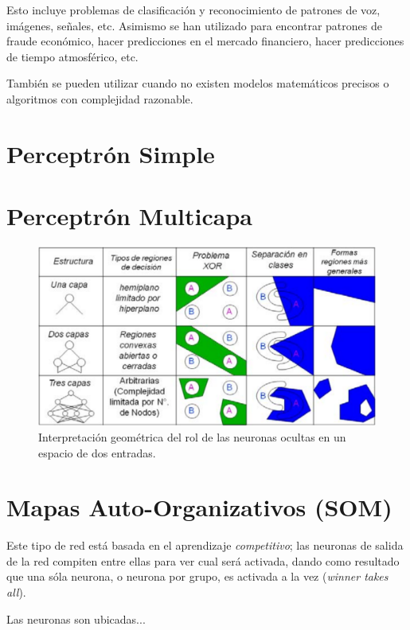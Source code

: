 \documentclass[10pt,a4paper]{article}
\begin{document}
Esto incluye problemas de clasificación y reconocimiento de patrones de voz, imágenes, señales, etc. Asimismo se han utilizado para encontrar patrones de fraude económico, hacer predicciones en el mercado financiero, hacer predicciones de tiempo atmosférico, etc.

También se pueden utilizar cuando no existen modelos matemáticos precisos o algoritmos con complejidad razonable.

\section{Perceptrón Simple}

\section{Perceptrón Multicapa}

\begin{figure}[h!]
  \caption{Interpretación geométrica del rol de las neuronas ocultas en un espacio de dos entradas.}
  \label{fig:layers}
  \centering
  \hbox{\includegraphics[width=\textwidth-\fboxrule-\fboxrule]{layers.png}}
\end{figure}

\section{Mapas Auto-Organizativos (SOM)}

Este tipo de red está basada en el aprendizaje \textit{competitivo}; las neuronas de salida de la red compiten entre ellas para ver cual será activada, dando como resultado que una sóla neurona, o neurona por grupo, es activada a la vez (\textit{winner takes all}).

Las neuronas son ubicadas...
\end{document}
